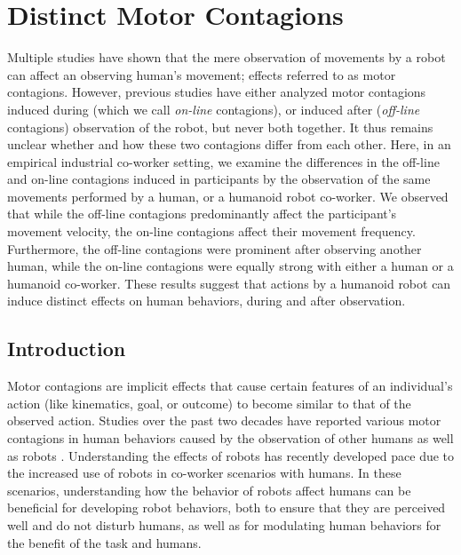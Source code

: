 \documentclass[a4paper, 12pt, oneside]{Thesis}  %
\begin{document}
\chapter{Distinct Motor Contagions}


Multiple studies have shown that the mere observation of movements by a robot can affect an observing human's movement; effects referred to as motor contagions. However, previous studies have either analyzed motor contagions induced during (which we call \emph{on-line} contagions), or induced after (\emph{off-line} contagions) observation of the robot, but never both together. It thus remains unclear whether and how these two contagions differ from each other. Here, in an empirical industrial co-worker setting, we examine the differences in the off-line and on-line contagions induced in participants by the observation of the same movements performed by a human, or a humanoid robot co-worker. We observed that while the off-line contagions predominantly affect the participant's movement velocity, the on-line contagions affect their movement frequency. Furthermore, the off-line contagions were prominent after observing another human, while the on-line contagions were equally strong with either a human or a humanoid co-worker. These results suggest that actions by a humanoid robot can induce distinct effects on human behaviors, during and after observation.  	

\clearpage
\section{Introduction}

Motor contagions are implicit effects that cause certain features of an individual's action (like kinematics, goal, or outcome) to become similar to that of the observed action. Studies over the past two decades have reported various motor contagions in human behaviors caused by the observation of other humans as well as robots \cite{Blakemore:Neuropsychologia:2005, Fadiga:JNeuroPhys:1995, Ganesh:Springer:2015, Sciutti:IJSR:2012, Prinz:EJPAP:1997}. Understanding the effects of robots has recently developed pace due to the increased use of robots in co-worker scenarios with humans. In these scenarios, understanding how the behavior of robots affect humans can be beneficial for developing robot behaviors, both to ensure that they are perceived well and do not disturb humans, as well as for modulating human behaviors for the benefit of the task and humans.  
\end{document}
